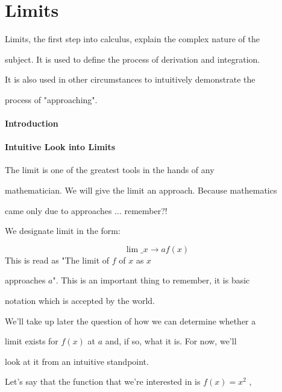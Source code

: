 \section{Limits}
\label{sec:limits}

Limits, the first step into calculus, explain the complex nature of the

subject. It is used to define the process of derivation and integration.

It is also used in other circumstances to intuitively demonstrate the

process of "approaching".



\paragraph{Introduction}



\paragraph{Intuitive Look into Limits}



The limit is one of the greatest tools in the hands of any

mathematician. We will give the limit an approach. Because mathematics

came only due to approaches ... remember?!



We designate limit in the form:



$$\lim\_{x\to a}f(x)$$ This is read as "The limit of $f$ of $x$ as $x$

approaches $a$". This is an important thing to remember, it is basic

notation which is accepted by the world.



We'll take up later the question of how we can determine whether a

limit exists for $f(x)$ at $a$ and, if so, what it is. For now, we'll

look at it from an intuitive standpoint.



Let's say that the function that we're interested in is $f(x)=x^2$ ,

